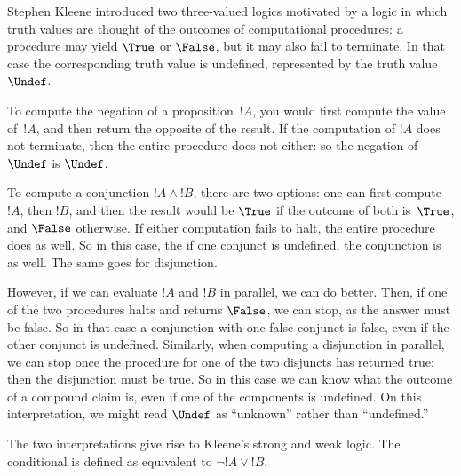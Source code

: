 \documentclass[../../../include/open-logic-section]{subfiles}
\begin{document}


Stephen Kleene introduced two three-valued logics motivated by a logic
in which truth values are thought of the outcomes of computational
procedures: a procedure may yield $\True$ or $\False$, but it may also
fail to terminate.  In that case the corresponding truth value is
undefined, represented by the truth value~$\Undef$.

To compute the negation of a proposition~$!A$, you would first compute
the value of~$!A$, and then return the opposite of the result.  If the
computation of $!A$ does not terminate, then the entire procedure does
not either: so the negation of $\Undef$ is $\Undef$.

To compute a conjunction $!A \land !B$, there are two options: one can
first compute~$!A$, then $!B$, and then the result would be $\True$ if
the outcome of both is~$\True$, and $\False$ otherwise.  If either
computation fails to halt, the entire procedure does as well. So in
this case, the if one conjunct is undefined, the conjunction is as
well.  The same goes for disjunction.

However, if we can evaluate $!A$ and $!B$ in parallel, we can do better.
Then, if one of the two procedures halts and returns $\False$, we can
stop, as the answer must be false.  So in that case a conjunction with
one false conjunct is false, even if the other conjunct is undefined.
Similarly, when computing a disjunction in parallel, we can stop once
the procedure for one of the two disjuncts has returned true: then the
disjunction must be true. So in this case we can know what the outcome
of a compound claim is, even if one of the components is undefined. On
this interpretation, we might read $\Undef$ as ``unknown'' rather than
``undefined.''

The two interpretations give rise to Kleene's strong and weak logic.
The conditional is defined as equivalent to $\lnot !A \lor !B$.
\end{document}
